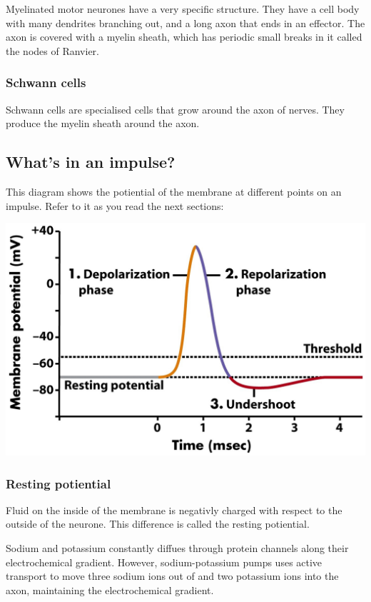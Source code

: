 \documentclass{article}
\begin{document}
Myelinated motor neurones have a very specific structure. They have a cell body
with many dendrites branching out, and a long axon that ends in an effector. The
axon is covered with a myelin sheath, which has periodic small breaks in it
called the nodes of Ranvier.

\subsubsection*{Schwann cells}

Schwann cells are specialised cells that grow around the axon of nerves. They
produce the myelin sheath around the axon.

\subsection*{What's in an impulse?}

This diagram shows the potiential of the membrane at different points on an
impulse. Refer to it as you read the next sections:

\begin{center}
	\includegraphics[scale=0.5]{action_potential}
\end{center}

\subsubsection*{Resting potiential}

Fluid on the inside of the membrane is negativly charged with respect to the
outside of the neurone. This difference is called the resting potiential.

Sodium and potassium constantly diffues through protein channels along their
electrochemical gradient. However, sodium-potassium pumps uses active transport
to move three sodium ions out of and two potassium ions into the axon,
maintaining the electrochemical gradient.
\end{document}
